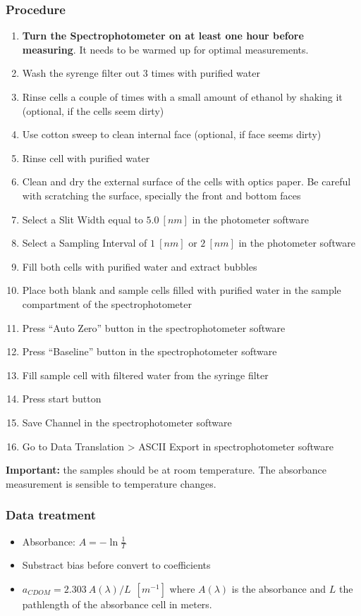 \documentclass[]{spie}  %
\begin{document}
\subsubsection{Procedure}
\begin{enumerate}
  \item \textbf{Turn the Spectrophotometer on at least one hour before measuring}. It needs to be warmed up for optimal measurements.
  \item Wash the syrenge filter out 3 times with purified water
  \item Rinse cells a couple of times with a small amount of ethanol by shaking it (optional, if the cells seem dirty)
  \item Use cotton sweep to clean internal face (optional, if face seems dirty)
  \item Rinse cell with purified water
  \item Clean and dry the external surface of the cells with optics paper. Be careful with scratching the surface, specially the front and bottom faces
  \item Select a Slit Width equal to $5.0~[nm]$ in the photometer software
  \item Select a Sampling Interval of $1~[nm]$ or $2~[nm]$ in the photometer software
  \item Fill both cells with purified water and extract bubbles
  \item Place both blank and sample cells filled with purified water in the sample compartment of the spectrophotometer
  \item Press ``Auto Zero'' button in the spectrophotometer software
  \item Press ``Baseline'' button in the spectrophotometer software
  \item Fill sample cell with filtered water from the syringe filter
  \item Press start button
  \item Save Channel in the spectrophotometer software
  \item Go to Data Translation > ASCII Export in spectrophotometer software
\end{enumerate}
\textbf{Important:} the samples should be at room temperature. The absorbance measurement is sensible to temperature changes.
\subsubsection{Data treatment}
\begin{itemize}
  \item Absorbance: $A=-\ln{\displaystyle\frac{1}{T}}$ 
  \item Substract bias before convert to coefficients
  \item $a_{CDOM}=2.303~A(\lambda)/L~~[m^{-1}]$ where $A(\lambda)$ is the absorbance and $L$ the pathlength of the absorbance cell in meters.
\end{itemize}
\end{document}
